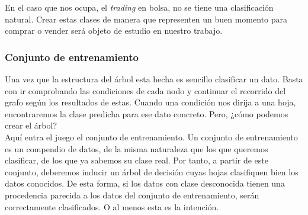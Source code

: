 \documentclass[12pt,a4paper]{article}
\begin{document}
			En el caso que nos ocupa, el \textit{trading} en bolsa, no se tiene una clasificaci\'on natural. Crear estas clases de manera que representen un buen momento para comprar o vender ser\'a objeto de estudio en nuestro trabajo.
			
			\subsubsection{Conjunto de entrenamiento}
			Una vez que la estructura del \'arbol esta hecha es sencillo clasificar un dato. Basta con ir comprobando las condiciones de cada nodo y continuar el recorrido del grafo seg\'un los resultados de estas. Cuando una condici\'on nos dirija a una hoja, encontraremos la clase predicha para ese dato concreto. Pero, ¿c\'omo podemos crear el \'arbol?\\
			
			Aqu\'i entra el juego el conjunto de entrenamiento. Un conjunto de entrenamiento es un compendio de datos, de la misma naturaleza que los que queremos clasificar, de los que ya sabemos su clase real. Por tanto, a partir de este conjunto, deberemos inducir un \'arbol de decisi\'on cuyas hojas clasifiquen bien los datos conocidos. De esta forma, si los datos con clase desconocida tienen una procedencia parecida a los datos del conjunto de entrenamiento, ser\'an correctamente clasificados. O al menos esta es la intenci\'on.
	
	
	
		
\newpage



\end{document}
